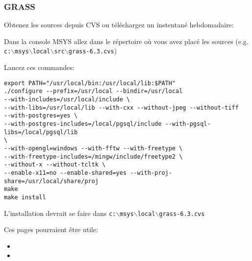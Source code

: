 \subsubsection{GRASS}
Obtenez les sources depuis CVS ou téléchargez un instentané hebdomadaire:

 \begin{quotation}
 \end{quotation}

Dans la console MSYS allez dans le répertoire où vous avez placé les sources (e.g. \texttt{c:$\backslash$msys$\backslash$local$\backslash$src$\backslash$grass-6.3.cvs})

Lancez ces commandes:

\begin{verbatim}
export PATH="/usr/local/bin:/usr/local/lib:$PATH"
./configure --prefix=/usr/local --bindir=/usr/local
--with-includes=/usr/local/include \
--with-libs=/usr/local/lib --with-cxx --without-jpeg --without-tiff
--with-postgres=yes \
--with-postgres-includes=/local/pgsql/include --with-pgsql-libs=/local/pgsql/lib
\
--with-opengl=windows --with-fftw --with-freetype \
--with-freetype-includes=/mingw/include/freetype2 \
--without-x --without-tcltk \
--enable-x11=no --enable-shared=yes --with-proj-share=/usr/local/share/proj
make
make install
\end{verbatim}

% 

L'installation devrait se faire dans \texttt{c:$\backslash$msys$\backslash$local$\backslash$grass-6.3.cvs}

Ces pages pourraient être utile:

\begin{itemize}
\item
{}
\item
{}
\end{itemize}

